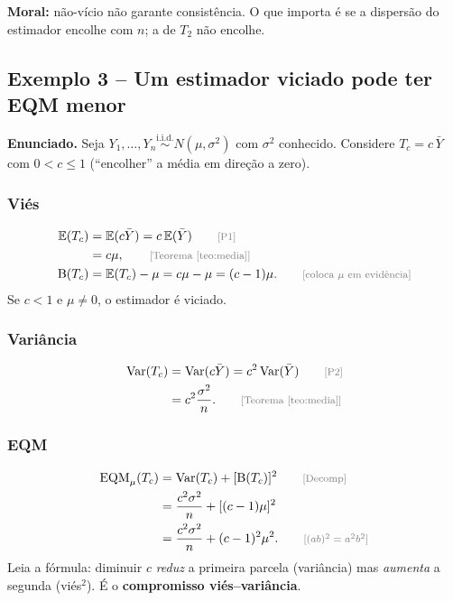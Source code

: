 \documentclass[11pt,a4paper]{article}
\theoremstyle{definition}
\theoremstyle{plain}
\newcommand{\E}{\mathbb{E}}
\newcommand{\Var}{\operatorname{Var}}
\newcommand{\EQM}{\operatorname{EQM}}
\newcommand{\B}{\operatorname{B}}
\newcommand{\iid}{\overset{\text{i.i.d.}}{\sim}}
\newcommand{\bY}{\bar{Y}}
\newcommand{\just}[1]{\tag*{\footnotesize\textcolor{gray}{[#1]}}}
\begin{document}
\textbf{Moral:} não-vício não garante consistência. O que importa é se a dispersão do estimador encolhe com $n$; a de $T_2$ não encolhe.

\subsection{Exemplo 3 -- Um estimador viciado pode ter EQM menor}\label{ex:shrink}

\textbf{Enunciado.} Seja $Y_1,\dots,Y_n\iid N(\mu,\sigma^2)$ com $\sigma^2$ conhecido. Considere $T_c=c\,\bY$ com $0<c\le1$ (``encolher'' a média em direção a zero).

\subsubsection*{Viés}
\begin{align*}
\E(T_c)&=\E(c\bY)=c\,\E(\bY) \just{P1}\\
&=c\mu, \just{Teorema~\ref{teo:media}}\\
\B(T_c)&=\E(T_c)-\mu=c\mu-\mu=(c-1)\mu . \just{coloca $\mu$ em evidência}
\end{align*}
Se $c<1$ e $\mu\neq0$, o estimador é viciado.

\subsubsection*{Variância}
\begin{align*}
\Var(T_c)&=\Var(c\bY)=c^2\Var(\bY) \just{P2}\\
&=c^2\frac{\sigma^2}{n}. \just{Teorema~\ref{teo:media}}
\end{align*}

\subsubsection*{EQM}
\begin{align*}
\EQM_\mu(T_c)&=\Var(T_c)+[\B(T_c)]^2 \just{Decomp}\\
&=\frac{c^2\sigma^2}{n}+[(c-1)\mu]^2\\
&=\frac{c^2\sigma^2}{n}+(c-1)^2\mu^2 . \just{$(ab)^2=a^2b^2$}
\end{align*}
Leia a fórmula: diminuir $c$ \emph{reduz} a primeira parcela (variância) mas \emph{aumenta} a segunda (viés$^2$). É o \textbf{compromisso viés--variância}.
\end{document}
